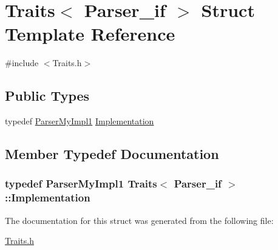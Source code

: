 \hypertarget{struct_traits_3_01_parser__if_01_4}{\section{Traits$<$ Parser\-\_\-if $>$ Struct Template Reference}
\label{struct_traits_3_01_parser__if_01_4}
}


{\ttfamily \#include $<$Traits.\-h$>$}

\subsection*{Public Types}
\begin{DoxyCompactItemize}
\item 
typedef \hyperlink{class_parser_my_impl1}{Parser\-My\-Impl1} \hyperlink{struct_traits_3_01_parser__if_01_4_ad255fa4d0635c0fd54986d3c2e8f53da}{Implementation}
\end{DoxyCompactItemize}


\subsection{Member Typedef Documentation}
\hypertarget{struct_traits_3_01_parser__if_01_4_ad255fa4d0635c0fd54986d3c2e8f53da}{
\subsubsection[{Implementation}]{\setlength{\rightskip}{0pt plus 5cm}typedef {\bf Parser\-My\-Impl1} {\bf Traits}$<$ {\bf Parser\-\_\-if} $>$\-::{\bf Implementation}}}\label{struct_traits_3_01_parser__if_01_4_ad255fa4d0635c0fd54986d3c2e8f53da}


The documentation for this struct was generated from the following file\-:\begin{DoxyCompactItemize}
\item 
\hyperlink{_traits_8h}{Traits.\-h}\end{DoxyCompactItemize}
